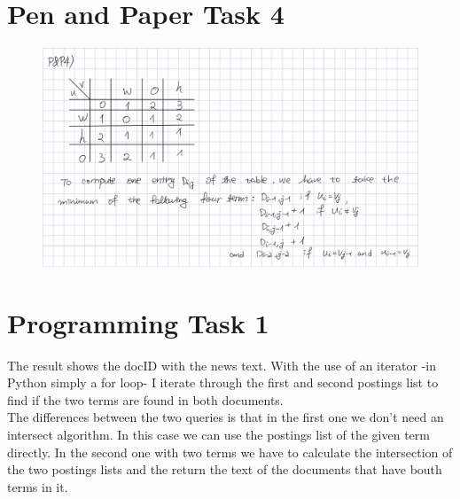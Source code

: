 \documentclass[a4paper]{scrartcl}
\begin{document}
\clearpage
\section*{Pen and Paper Task 4}
\begin{figure}[ht]
    \includegraphics[width=1\textwidth]{img/p&p4.png}
\end{figure}

\clearpage
\section*{Programming Task 1}


The result shows the docID with the news text. With the use of an iterator -in Python simply a for loop- I iterate through the first and second postings list to find if the two terms are found in both documents.\\
The differences between the two queries is that in the first one we don't need an intersect algorithm.
In this case we can use the postings list of the given term directly. In the second one with two terms we have to calculate the intersection of the two postings lists and the return the text of the documents that have bouth terms in it.
\end{document}
